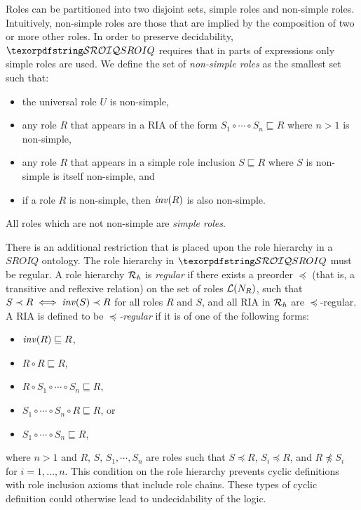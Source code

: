Roles can be partitioned into two disjoint sets, simple roles and non-simple roles. Intuitively, non-simple roles are those that are implied by the composition of two or more other roles. In order to preserve decidability, $\SROIQ$ requires that in parts of expressions only simple roles are used. We define the set of \emph{non-simple roles} as the smallest set such that:
\begin{itemize}
    \item the universal role $U$ is non-simple,
    \item any role $R$ that appears in a RIA of the form $S_1 \circ \cdots \circ S_n \sqsubseteq R$ where $n > 1$ is non-simple,
    \item any role $R$ that appears in a simple role inclusion $S \sqsubseteq R$ where $S$ is non-simple is itself non-simple, and
    \item if a role $R$ is non-simple, then $\mathit{inv}(R)$ is also non-simple.
\end{itemize}
All roles which are not non-simple are \emph{simple roles}.

\begin{example}
\end{example}

There is an additional restriction that is placed upon the role hierarchy in a $SROIQ$ ontology. The role hierarchy in $\SROIQ$ must be regular. A role hierarchy $\mathcal{R}_h$ is \emph{regular} if there exists a preorder $\preceq$ (that is, a transitive and reflexive relation) on the set of roles $\mathcal{L}(N_R)$, such that $S \prec R \iff \mathit{inv}(S) \prec R$ for all roles $R$ and $S$, and all RIA in $\mathcal{R}_h$ are $\preceq$-regular. A RIA is defined to be $\preceq$\emph{-regular} if it is of one of the following forms:
\begin{itemize}
    \item $\mathit{inv}(R) \sqsubseteq R$,
    \item $R \circ R \sqsubseteq R$,
    \item $R \circ S_1 \circ \cdots \circ S_n \sqsubseteq R$,
    \item $S_1 \circ \cdots \circ S_n \circ R \sqsubseteq R$, or
    \item $S_1 \circ \cdots \circ S_n \sqsubseteq R$,
\end{itemize}
where $n > 1$ and $R$, $S$, $S_1, \cdots, S_n$ are roles such that $S \preceq R$, $S_i \preceq R$, and $R \not\preceq S_i$ for $i = 1, \dots, n$. This condition on the role hierarchy prevents cyclic definitions with role inclusion axioms that include role chains. These types of cyclic definition could otherwise lead to undecidability of the logic.

